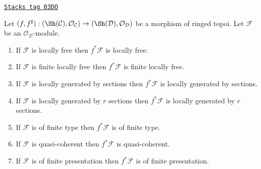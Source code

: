\begin{lemma}
\label{sites-modules-lemma-local-pullback}
\href{https://stacks.math.columbia.edu/tag/03DO}{\texttt{Stacks tag 03DO}}

Let
$(f, f^\sharp) :
(\Sh(\mathcal{C}), \mathcal{O}_\mathcal{C})
\to
(\Sh(\mathcal{D}), \mathcal{O}_\mathcal{D})$
be a morphism of ringed topoi.
Let $\mathcal{F}$ be an $\mathcal{O}_\mathcal{D}$-module.
\begin{enumerate}
\item If $\mathcal{F}$ is locally free then $f^*\mathcal{F}$ is locally free.
\item If $\mathcal{F}$ is finite locally free then $f^*\mathcal{F}$ is
finite locally free.
\item If $\mathcal{F}$ is locally generated by sections
then $f^*\mathcal{F}$ is locally generated by sections.
\item If $\mathcal{F}$ is locally generated by $r$ sections
then $f^*\mathcal{F}$ is locally generated by $r$ sections.
\item If $\mathcal{F}$ is of finite type
then $f^*\mathcal{F}$ is of finite type.
\item If $\mathcal{F}$ is quasi-coherent then
$f^*\mathcal{F}$ is quasi-coherent.
\item If $\mathcal{F}$ is of finite presentation
then $f^*\mathcal{F}$ is of finite presentation.
\end{enumerate}
\end{lemma}

